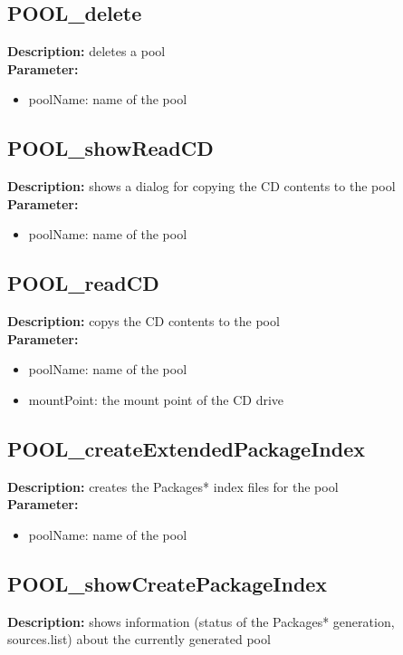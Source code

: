 \subsection{POOL\_delete}
\textbf{Description:} deletes a pool\\
\textbf{Parameter:}
\begin{itemize}
\item poolName: name of the pool
\end{itemize}

\subsection{POOL\_showReadCD}
\textbf{Description:} shows a dialog for copying the CD contents to the pool\\
\textbf{Parameter:}
\begin{itemize}
\item poolName: name of the pool
\end{itemize}

\subsection{POOL\_readCD}
\textbf{Description:} copys the CD contents to the pool\\
\textbf{Parameter:}
\begin{itemize}
\item poolName: name of the pool
\item mountPoint: the mount point of the CD drive
\end{itemize}

\subsection{POOL\_createExtendedPackageIndex}
\textbf{Description:} creates the Packages* index files for the pool\\
\textbf{Parameter:}
\begin{itemize}
\item poolName: name of the pool
\end{itemize}

\subsection{POOL\_showCreatePackageIndex}
\textbf{Description:} shows information (status of the Packages* generation, sources.list) about the currently generated pool\\

